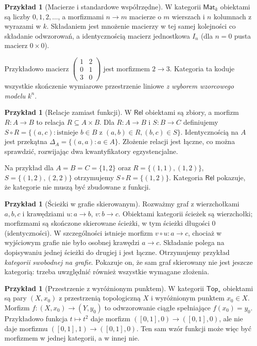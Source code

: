 \documentclass[11pt,a4paper]{article}
\numberwithin{equation}{section}
\theoremstyle{plain}
\theoremstyle{definition}
\newtheorem{przyklad}[twierdzenie]{Przykład}
\theoremstyle{remark}
\newcommand{\cat}[1]{\mathsf{#1}}
\newcommand{\Top}{\cat{Top}}
\newcommand{\Rel}{\cat{Rel}}
\begin{document}
\begin{przyklad}[Macierze i standardowe współrzędne]\label{przyklad:mat}
W kategorii $\cat{Mat}_k$ obiektami są liczby $0,1,2,\ldots$, a morfizmami $n\to m$ macierze o $m$ wierszach i $n$ kolumnach z wyrazami w $k$. Składaniem jest mnożenie macierzy w tej samej kolejności co składanie odwzorowań, a identycznością macierz jednostkowa $I_n$ (dla $n=0$ pusta macierz $0\times0$).

Przykładowo macierz $\begin{pmatrix}1&2\\0&1\\3&0\end{pmatrix}$ jest morfizmem $2\to3$. Kategoria ta koduje wszystkie skończenie wymiarowe przestrzenie liniowe \emph{z wyborem wzorcowego modelu} $k^n$.
\end{przyklad}

\begin{przyklad}[Relacje zamiast funkcji]
W $\Rel$ obiektami są zbiory, a morfizm $R:A\to B$ to relacja $R\subseteq A\times B$. Dla $R:A\to B$ i $S:B\to C$ definiujemy $S\circ R=\{(a,c):\text{istnieje }b\in B\text{ z }(a,b)\in R,(b,c)\in S\}$. Identycznością na $A$ jest przekątna $\Delta_A=\{(a,a):a\in A\}$. Złożenie relacji jest łączne, co można sprawdzić, rozwijając dwa kwantyfikatory egzystencjalne.

Na przykład dla $A=B=C=\{1,2\}$ oraz $R=\{(1,1),(1,2)\}$, $S=\{(1,2),(2,2)\}$ otrzymujemy $S\circ R=\{(1,2)\}$. Kategoria $\Rel$ pokazuje, że kategorie nie muszą być zbudowane z funkcji.
\end{przyklad}


\begin{przyklad}[Ścieżki w grafie skierowanym]\label{przyklad:sciezki}
Rozważmy graf z wierzchołkami $a,b,c$ i krawędziami $u:a\to b$, $v:b\to c$. Obiektami kategorii ścieżek są wierzchołki; morfizmami są skończone skierowane ścieżki, w tym ścieżki długości $0$ (identyczności). W szczególności istnieje morfizm $v\circ u:a\to c$, chociaż w wyjściowym grafie nie było osobnej krawędzi $a\to c$. Składanie polega na dopisywaniu jednej ścieżki do drugiej i jest łączne. Otrzymujemy przykład \emph{kategorii swobodnej na grafie}. Pokazuje on, że sam graf skierowany nie jest jeszcze kategorią: trzeba uwzględnić również wszystkie wymagane złożenia.
\end{przyklad}

\begin{przyklad}[Przestrzenie z wyróżnionym punktem]
W kategorii $\Top_*$ obiektami są pary $(X,x_0)$ z przestrzenią topologiczną $X$ i wyróżnionym punktem $x_0\in X$. Morfizm $f:(X,x_0)\to(Y,y_0)$ to odwzorowanie ciągłe spełniające $f(x_0)=y_0$. Przykładowo funkcja $t\mapsto t^2$ daje morfizm $([0,1],0)\to([0,1],0)$, ale nie daje morfizmu $([0,1],1)\to([0,1],0)$. Ten sam wzór funkcji może więc być morfizmem w jednej kategorii, a w innej nie.
\end{przyklad}
\end{document}
